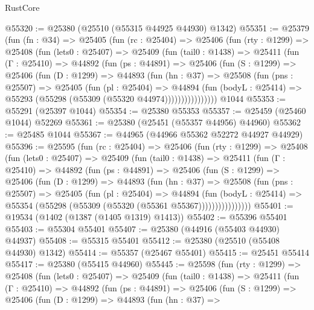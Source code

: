 \begin{lexlean}{RustCore}
\begin{coremodule}
@55320 := @25380 (@25510 (@55315 @44925 @44930) @1342)
@55351 := @25379
    (fun (fn : @34) =>
    @25405
      (fun (rc : @25404) =>
      @25406
        (fun (rty : @1299) =>
        @25408
          (fun (lets0 : @25407) =>
          @25409
            (fun (tail0 : @1438) =>
            @25411
              (fun (Γ : @25410) =>
              @44892
                (fun (ps : @44891) =>
                @25406
                  (fun (S : @1299) =>
                  @25406
                    (fun (D : @1299) =>
                    @44893
                      (fun (hn : @37) =>
                      @25508
                        (fun (pns : @25507) =>
                        @25405
                          (fun (pl : @25404) =>
                          @44894
                            (fun (bodyL : @25414) =>
                            @55293 (@55298 (@55309 (@55320 @44974))))))))))))))))
    @1044
@55353 := @55291 (@25397 @1044)
@55354 := @25380 @55353
@55357 := @25459 (@25460 @1044) @52269
@55361 := @25380 (@25451 (@55357 @44956) @44960)
@55362 := @25485 @1044
@55367 := @44965 (@44966 @55362 @52272 @44927 @44929)
@55396 := @25595
    (fun (rc : @25404) =>
    @25406
      (fun (rty : @1299) =>
      @25408
        (fun (lets0 : @25407) =>
        @25409
          (fun (tail0 : @1438) =>
          @25411
            (fun (Γ : @25410) =>
            @44892
              (fun (ps : @44891) =>
              @25406
                (fun (S : @1299) =>
                @25406
                  (fun (D : @1299) =>
                  @44893
                    (fun (hn : @37) =>
                    @25508
                      (fun (pns : @25507) =>
                      @25405
                        (fun (pl : @25404) =>
                        @44894
                          (fun (bodyL : @25414) =>
                          @55354 (@55298 (@55309 (@55320 (@55361 @55367))))))))))))))))
@55401 := @19534 (@1402 (@1387 (@1405 @1319) @1413))
@55402 := @55396 @55401
@55403 := @55304 @55401
@55407 := @25380 (@44916 (@55403 @44930) @44937)
@55408 := @55315 @55401
@55412 := @25380 (@25510 (@55408 @44930) @1342)
@55414 := @55357 (@25467 @55401)
@55415 := @25451 @55414
@55417 := @25380 (@55415 @44960)
@55445 := @25598
    (fun (rty : @1299) =>
    @25408
      (fun (lets0 : @25407) =>
      @25409
        (fun (tail0 : @1438) =>
        @25411
          (fun (Γ : @25410) =>
          @44892
            (fun (ps : @44891) =>
            @25406
              (fun (S : @1299) =>
              @25406
                (fun (D : @1299) =>
                @44893
                  (fun (hn : @37) =>

\end{coremodule}
\end{lexlean}
